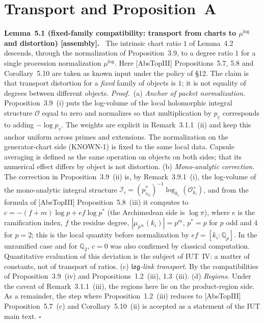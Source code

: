 \documentclass[11pt]{article}
\newcommand{\cO}{\mathcal O}
\newcommand{\stmt}[2]{\medskip\noindent\textbf{#1\ #2.}\ }
\newcommand{\pf}{\medskip\noindent\textit{Proof.}\ }
\newcommand{\qedh}{\hfill\(\square\)\par\medskip}
\begin{document}
\section{Transport and Proposition~A}

\stmt{Lemma}{5.1 (fixed-family compatibility: transport from charts to $\mu^{\log}$ and distortion) [assembly]}
The intrinsic chart ratio $1$ of Lemma~4.2 descends, through the
normalization of Proposition~3.9, to a degree ratio $1$ for a single
procession normalization $\mu^{\log}$.  Here [AbsTopIII]
Propositions~5.7, 5.8 and Corollary~5.10 are taken as known input
under the policy of \S12.  The claim is that transport distortion
for a \emph{fixed} family of objects is $1$; it is not equality of
degrees between different objects.
\pf (a) \emph{Anchor of packet normalization.}
Proposition~3.9~(i) puts the log-volume of the local holomorphic
integral structure $\cO$ equal to zero and normalizes so that
multiplication by $p_{\underline v}$ corresponds to adding
$-\log p_{\underline v}$.  The weights are explicit in
Remark~3.1.1~(ii) and keep this anchor uniform across primes and
extensions.  The normalization on the generator-chart side
(KNOWN-1) is fixed to the same local data.  Capsule averaging is
defined as the same operation on objects on both sides; that its
numerical effect differs by object is not distortion.
(b) \emph{Mono-analytic correction.}  The correction in
Proposition~3.9~(ii) is, by Remark~3.9.1~(i), the log-volume of the
mono-analytic integral structure
$\mathcal I_i=(p^{*}_{v_{\mathbb Q}})^{-1}
\log_{k_i}(\cO_{k_i}^{\times})$, and from the formula of [AbsTopIII]
Proposition~5.8~(iii) it computes to
$c=-(f+m)\log p+ef\log p^{*}$ (the Archimedean side is $\log\pi$),
where $e$ is the ramification index, $f$ the residue degree,
$|\mu_{p^\infty}(k_i)|=p^m$, $p^{*}=p$ for $p$ odd and $4$ for
$p=2$; this is the local quantity before normalization by
$ef=[k_i:\mathbb Q_p]$.  In the unramified case and for
$\mathbb Q_2$, $c=0$ was also confirmed by classical computation.
Quantitative evaluation of this deviation is the subject of IUT~IV:
a matter of constants, not of transport of ratios.
(c) \emph{$\mathfrak{log}$-link transport.}  By the compatibilities
of Proposition~3.9~(iv) and Propositions~1.2~(iii), 1.3~(iii).
(d) \emph{Regions.}  Under the caveat of Remark~3.1.1~(iii), the
regions here lie on the product-region side.  As a remainder, the
step where Proposition~1.2~(iii) reduces to [AbsTopIII]
Proposition~5.7~(c) and Corollary~5.10~(ii) is accepted as a
statement of the IUT main text. \qedh
\end{document}

